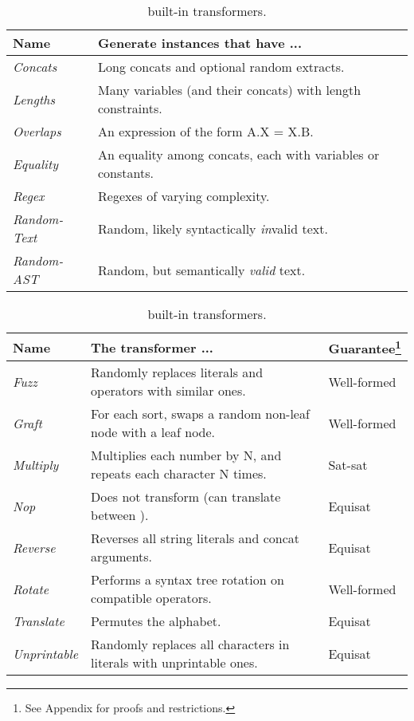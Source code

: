 \begin{table}[t]
    \centering
    \caption{\generator{} built-in generators.}
    \label{tbl:generators}
    \begin{tabular}{|l|l|}
        \hline
        \textbf{Name}
        & \textbf{Generate instances that have ...}
        \\ \hline
        \textit{Concats}
        & Long concats and optional random extracts.
        \\ \hline
        \textit{Lengths}
        & Many variables (and their concats) with length constraints.
        \\ \hline
        \textit{Overlaps}
        & An expression of the form A.X = X.B.
        \\ \hline
        \textit{Equality}
        & An equality among concats, each with variables or constants.
        \\ \hline
        \textit{Regex}
        & Regexes of varying complexity.
        \\ \hline
        \textit{Random-Text}
        & Random, likely syntactically \textit{in}valid text.
        \\ \hline
        \textit{Random-AST}
        & Random, but semantically \textit{valid} text.
        \\ \hline
    \end{tabular}
    
    \caption{\transformer{} built-in transformers.}
    \label{tbl:transformers}
    \begin{tabular}{|l|l|l|}
        \hline
        \textbf{Name}
        & \textbf{The transformer ...}
        & \textbf{Guarantee}\footnote{See Appendix for proofs and restrictions.}
        \\ \hline
        \textit{Fuzz}
        & Randomly replaces literals and operators with similar ones.
        & Well-formed
        \\ \hline
        \textit{Graft}
        & For each sort, swaps a random non-leaf node with a leaf node.
        & Well-formed
        \\ \hline
        \textit{Multiply}
        & Multiplies each number by N, and repeats each character N times.
        & Sat-sat
        \\ \hline
        \textit{Nop}
        & Does not transform (can translate between \smtfull{}).
        & Equisat
        \\ \hline
        \textit{Reverse}
        & Reverses all string literals and concat arguments.
        & Equisat
        \\ \hline
        \textit{Rotate}
        & Performs a syntax tree rotation on compatible operators.
        & Well-formed
        \\ \hline
        \textit{Translate}
        & Permutes the alphabet.
        & Equisat
        \\ \hline
        \textit{Unprintable}
        & Randomly replaces all characters in literals with unprintable ones.
        & Equisat
        \\ \hline
    \end{tabular}
\end{table}

